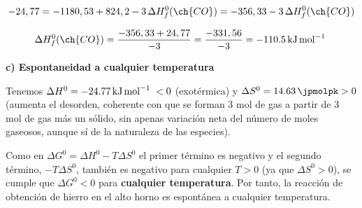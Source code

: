 \begin{exerciseEVAU}
\begin{solu}
        \begin{equation*}
            -24,77 = -1180,53 + 824,2 - 3\, \Delta H^0_f (\ch{CO}) = -356,33 - 3\, \Delta H^0_f (\ch{CO})
        \end{equation*}

        \begin{equation*}
            \Delta H^0_f (\ch{CO}) = \dfrac{-356,33 + 24,77}{-3} = \dfrac{-331,56}{-3} = \energia[kjmol]{-110.5}
        \end{equation*}

        \textbf{c) Espontaneidad a cualquier temperatura}

        Tenemos \(\Delta H^0 = \energia[kjmol]{-24.77} < 0\) (exotérmica) y \(\Delta S^0 = \SI{14.63}{\jpmolpk} > 0\) (aumenta el desorden, coherente con que se forman 3 mol de gas  a partir de 3 mol de gas  más un sólido, sin apenas variación neta del número de moles gaseosos, aunque sí de la naturaleza de las especies).

        Como en \(\Delta G^0 = \Delta H^0 - T \Delta S^0\) el primer término es negativo y el segundo término, \(-T\Delta S^0\), también es negativo para cualquier \(T>0\) (ya que \(\Delta S^0>0\)), se cumple que \(\Delta G^0 < 0\) para \textbf{cualquier temperatura}. Por tanto, la reacción de obtención de hierro en el alto horno es espontánea a cualquier temperatura.

    \end{solu}
\end{exerciseEVAU}

